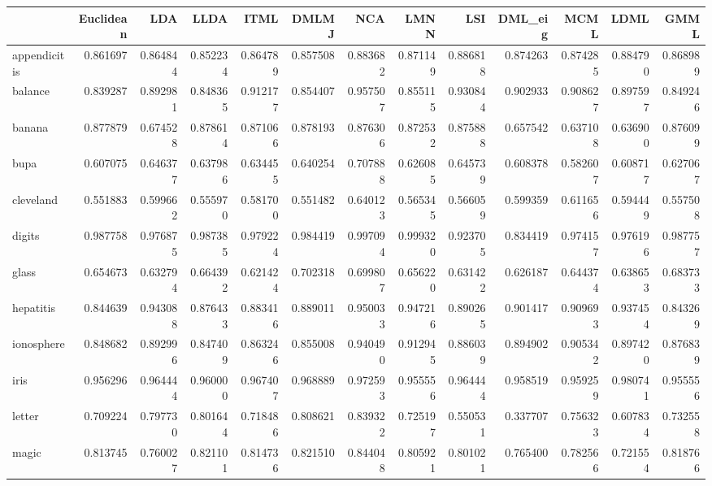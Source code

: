 \begin{tabular}{lrrrrrrrrrrrr}
\toprule
{} &  Euclidean &       LDA &      LLDA &      ITML &     DMLMJ &       NCA &      LMNN &       LSI &   DML\_eig &      MCML &      LDML &      GMML \\
\midrule
appendicitis    &   0.861697 &  0.864844 &  0.852234 &  0.864789 &  0.857508 &  0.883682 &  0.871149 &  0.886818 &  0.874263 &  0.874285 &  0.884790 &  0.868989 \\
balance         &   0.839287 &  0.892981 &  0.848365 &  0.912177 &  0.854407 &  0.957507 &  0.855115 &  0.930844 &  0.902933 &  0.908627 &  0.897597 &  0.849246 \\
banana          &   0.877879 &  0.674528 &  0.878614 &  0.871066 &  0.878193 &  0.876306 &  0.872532 &  0.875888 &  0.657542 &  0.637108 &  0.636900 &  0.876099 \\
bupa            &   0.607075 &  0.646377 &  0.637986 &  0.634455 &  0.640254 &  0.707888 &  0.626085 &  0.645739 &  0.608378 &  0.582607 &  0.608717 &  0.627067 \\
cleveland       &   0.551883 &  0.599662 &  0.555970 &  0.581700 &  0.551482 &  0.640123 &  0.565345 &  0.566059 &  0.599359 &  0.611656 &  0.594449 &  0.557508 \\
digits          &   0.987758 &  0.976875 &  0.987385 &  0.979224 &  0.984419 &  0.997094 &  0.999320 &  0.923705 &  0.834419 &  0.974157 &  0.976196 &  0.987757 \\
glass           &   0.654673 &  0.632794 &  0.664392 &  0.621424 &  0.702318 &  0.699807 &  0.656220 &  0.631422 &  0.626187 &  0.644374 &  0.638653 &  0.683733 \\
hepatitis       &   0.844639 &  0.943088 &  0.876433 &  0.883416 &  0.889011 &  0.950033 &  0.947216 &  0.890265 &  0.901417 &  0.909693 &  0.937454 &  0.843269 \\
ionosphere      &   0.848682 &  0.892996 &  0.847409 &  0.863246 &  0.855008 &  0.940490 &  0.912945 &  0.886039 &  0.894902 &  0.905342 &  0.897420 &  0.876839 \\
iris            &   0.956296 &  0.964444 &  0.960000 &  0.967407 &  0.968889 &  0.972593 &  0.955556 &  0.964444 &  0.958519 &  0.959259 &  0.980741 &  0.955556 \\
letter          &   0.709224 &  0.797730 &  0.801644 &  0.718486 &  0.808621 &  0.839322 &  0.725197 &  0.550531 &  0.337707 &  0.756323 &  0.607834 &  0.732558 \\
magic           &   0.813745 &  0.760027 &  0.821101 &  0.814736 &  0.821510 &  0.844048 &  0.805921 &  0.801021 &  0.765400 &  0.782566 &  0.721554 &  0.818766 \\

\end{tabular}
